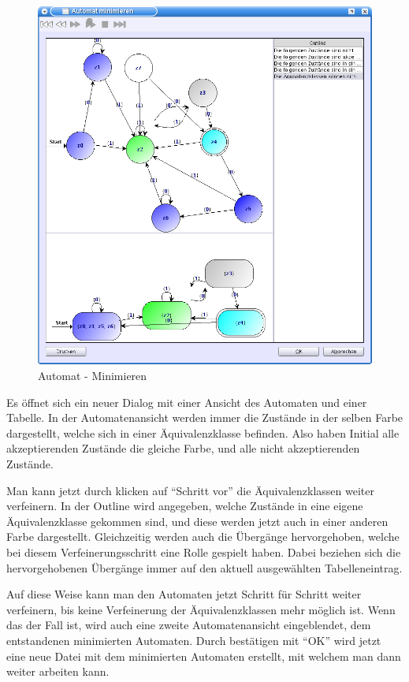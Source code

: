   \begin{figure}[h]
  \begin{center}
  \includegraphics[width=12cm]{images/minimize.png}
  \caption{Automat - Minimieren}
  \end{center}
  \end{figure}
  
  Es öffnet sich ein neuer Dialog mit einer Ansicht des Automaten und einer
  Tabelle. In der Automatenansicht werden immer die Zustände in der selben Farbe
  dargestellt, welche sich in einer Äquivalenzklasse befinden. Also haben Initial
  alle akzeptierenden Zustände die gleiche Farbe, und alle nicht akzeptierenden
  Zustände.\vspace{10pt}
  
  Man kann jetzt durch klicken auf "`Schritt vor"' die Äquivalenzklassen weiter
  verfeinern. In der Outline wird angegeben, welche Zustände in eine eigene
  Äquivalenzklasse gekommen sind, und diese werden jetzt auch in einer anderen
  Farbe dargestellt. Gleichzeitig werden auch die Übergänge hervorgehoben, welche
  bei diesem Verfeinerungsschritt eine Rolle gespielt haben. Dabei beziehen sich
  die hervorgehobenen Übergänge immer auf den aktuell ausgewählten
  Tabelleneintrag.\vspace{10pt}
  
  Auf diese Weise kann man den Automaten jetzt Schritt für Schritt weiter
  verfeinern, bis keine Verfeinerung der Äquivalenzklassen mehr möglich ist. Wenn
  das der Fall ist, wird auch eine zweite Automatenansicht eingeblendet, dem
  entstandenen minimierten Automaten. Durch bestätigen mit "`OK"' wird jetzt
  eine neue Datei mit dem minimierten Automaten erstellt, mit welchem man dann
  weiter arbeiten kann.\vspace{10pt}
  
